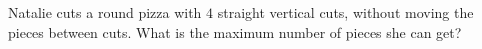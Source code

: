 Natalie cuts a round pizza with $4$ straight vertical cuts, without moving the pieces between cuts. What is the maximum number of pieces she can get?
